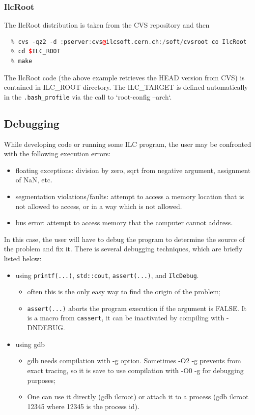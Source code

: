 \documentclass[12pt,a4paper,twoside]{article}
\begin{document}
\subsubsection{IlcRoot}

The IlcRoot distribution is taken from the CVS repository and then 
\begin{lstlisting}[language=C++]
  % cd $ILC
  % cvs -qz2 -d :pserver:cvs@ilcsoft.cern.ch:/soft/cvsroot co IlcRoot
  % cd $ILC_ROOT
  % make
\end{lstlisting}

The IlcRoot code (the above example retrieves the HEAD version from CVS) is contained in
ILC\_ROOT directory. The ILC\_TARGET is defined automatically in
the \texttt{.bash\_profile} via the call to `root-config --arch`.



\subsection{Debugging}

While developing code or running some ILC program, the user may be
confronted with the following execution errors:

\begin{itemize}
\item floating exceptions: division by zero, sqrt from negative
  argument, assignment of NaN, etc.
\item segmentation violations/faults: attempt to access a memory
  location that is not allowed to access, or in a way which is not
  allowed.
\item bus error: attempt to access memory that the computer cannot
  address.
\end{itemize}

In this case, the user will have to debug the program to determine the
source of the problem and fix it. There is several debugging
techniques, which are briefly listed below:

\begin{itemize}
\item using \texttt{printf(...)}, \texttt{std::cout}, \texttt{assert(...)}, and
  \texttt{IlcDebug}.
  \begin{itemize}
  \item often this is the only easy way to find the origin of the
    problem;
  \item \texttt{assert(...)} aborts the program execution if the
    argument is FALSE. It is a macro from \texttt{cassert}, it can be
    inactivated by compiling with -DNDEBUG.
  \end{itemize}
\item using gdb
  \begin{itemize}
  \item gdb needs compilation with -g option. Sometimes -O2 -g
    prevents from exact tracing, so it is save to use compilation with
    -O0 -g for debugging purposes;
  \item One can use it directly (gdb ilcroot) or attach it to a
    process (gdb ilcroot 12345 where 12345 is the process id).
  \end{itemize}
\end{itemize}
\end{document}

